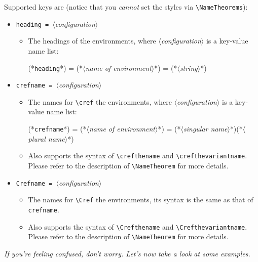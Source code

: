 \documentclass[classical]{einfart}
\newcommand{\meta}[1]{$\langle${\normalfont\itshape#1}$\rangle$}
\newcommand{\commandoption}[1]{\textcolor{code-keys}{\texttt{#1}}}
\begin{document}
Supported keys are (notice that you \emph{cannot} set the styles via \lstinline|\NameTheorems|):
\vspace{-.2\baselineskip}
\begin{itemize}[label=,leftmargin=1.25em,itemindent=-1.25em]
    \item \commandoption{heading}\lstinline| = |\meta{configuration}
        \begin{itemize}
            \item The headings of the environments, where \meta{configuration} is a key-value name list:
\begin{code}
(*\commandoption{heading}*) = {
    (*\meta{name of environment}*) = (*\meta{string}*)
  }
\end{code}
        \end{itemize}
    \item \commandoption{crefname}\lstinline| = |\meta{configuration}
        \begin{itemize}
            \item The names for \lstinline|\cref| the environments, where \meta{configuration} is a key-value name list:
\begin{code}
(*\commandoption{crefname}*) = {
    (*\meta{name of environment}*) = {(*\meta{singular name}*)}{(*\meta{plural name}*)}
  }
\end{code}
            \item Also supports the syntax of \lstinline|\crefthename| and \lstinline|\crefthevariantname|.\\
            Please refer to the description of \lstinline|\NameTheorem| for more details.
        \end{itemize}
    \item \commandoption{Crefname}\lstinline| = |\meta{configuration}
        \begin{itemize}
            \item The names for \lstinline|\Cref| the environments, its syntax is the same as that of \commandoption{crefname}.
            \item Also supports the syntax of \lstinline|\Crefthename| and \lstinline|\Crefthevariantname|.\\
            Please refer to the description of \lstinline|\NameTheorem| for more details.
        \end{itemize}
\end{itemize}


\bigskip
\begin{center}
    \itshape
    If you're feeling confused, don't worry. Let's now take a look at some examples.
\end{center}
\end{document}
